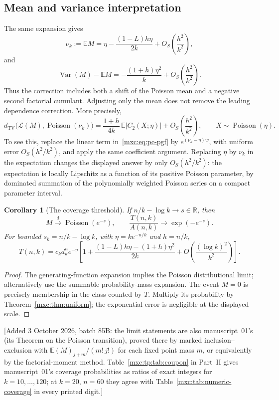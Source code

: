 \documentclass[11pt]{article}
\numberwithin{equation}{section}
\newtheorem{corollary}[theorem]{Corollary}
\theoremstyle{definition}
\theoremstyle{remark}
\newcommand{\E}{\mathbb E}
\DeclareMathOperator{\Pois}{Poisson}
\begin{document}
\subsection{Mean and variance interpretation}

The same expansion gives
\[
 \nu_k:=\mathbb E M
 =\eta-\frac{(1-L)h\eta}{2k}
 +O_S\!\left(\frac{h^2}{k^2}\right),
\]
and
\[
 \operatorname{Var}(M)-\mathbb E M
 =-\frac{(1+h)\eta^2}{k}
 +O_S\!\left(\frac{h^2}{k^2}\right).
\]
Thus the correction includes both a shift of the Poisson mean and
a negative second factorial cumulant.  Adjusting only the mean
does not remove the leading dependence correction.  More precisely,
\[
 d_{\mathrm{TV}}\bigl(\mathcal L(M),\operatorname{Poisson}(\nu_k)\bigr)
 =\frac{1+h}{4k}\,
 \mathbb E\bigl|C_2(X;\eta)\bigr|
 +O_S\!\left(\frac{h^2}{k^2}\right),
 \qquad X\sim\operatorname{Poisson}(\eta).
\]
To see this, replace the linear term in~\eqref{mxc:eq:pc-pgf} by
$e^{(\nu_k-\eta)w}$, with uniform error $O_S(h^2/k^2)$,
and apply the same coefficient argument.  Replacing $\eta$
by $\nu_k$ in the expectation changes the displayed answer by
only $O_S(h^2/k^2)$: the expectation is locally Lipschitz as a
function of its positive Poisson parameter, by dominated summation
of the polynomially weighted Poisson series on a compact parameter
interval.

\begin{corollary}[The coverage threshold]\label{mxc:cor:coverage}
If $n/k-\log k\to s\in\mathbb R$, then
\[
 M\xrightarrow{\mathrm d}\Pois(e^{-s}),\qquad
 \frac{T(n,k)}{A(n,k)}\longrightarrow\exp(-e^{-s}).
\]
For bounded $s_k=n/k-\log k$, with $\eta=k e^{-n/k}$ and $h=n/k$,
\begin{equation}\label{mxc:eq:critical-count}
 T(n,k)=c_kd_k^n e^{-\eta}
 \left[1+\frac{(1-L)h\eta-(1+h)\eta^2}{2k}
       +O\!\left(\frac{(\log k)^2}{k^2}\right)\right].
\end{equation}
\end{corollary}
\begin{proof}
The generating-function expansion implies the Poisson distributional
limit; alternatively use the summable probability-mass expansion.
The event $M=0$ is precisely membership in the class counted by $T$.
Multiply its probability by Theorem~\ref{mxc:thm:uniform}; the exponential
error is negligible at the displayed scale.
\end{proof}

[Added 3 October 2026, batch 85B: the limit statements are also
manuscript~01's (its Theorem on the Poisson transition), proved there by
marked inclusion--exclusion with $\E(M)_{j+m}/(m!\,j!)$ for each fixed
point mass $m$, or equivalently by the factorial-moment method.
Table~\ref{mxc:tp:tab:coupon} in Part~II gives manuscript~01's coverage
probabilities as ratios of exact integers for $k=10,\ldots,120$; at
$k=20$, $n=60$ they agree with Table~\ref{mxc:tab:numeric-coverage} in
every printed digit.]
\end{document}
